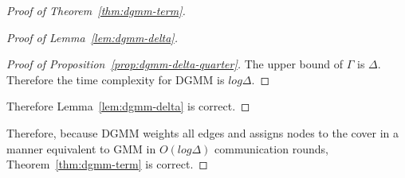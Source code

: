 \begin{proof}[Proof of Theorem~\ref{thm:dgmm-term}]
\begin{proof}[Proof of Lemma~\ref{lem:dgmm-delta}]
\begin{proof}[Proof of Proposition~\ref{prop:dgmm-delta-quarter}]
The upper bound of $\Gamma$ is $\Delta$. Therefore the time complexity for DGMM is $log \Delta$.

\end{proof}

Therefore Lemma~\ref{lem:dgmm-delta} is correct.
\end{proof}

Therefore, because DGMM weights all edges and assigns nodes to the cover in a manner equivalent to GMM in $O(log \Delta)$ communication rounds, Theorem~\ref{thm:dgmm-term} is correct.
\end{proof}
